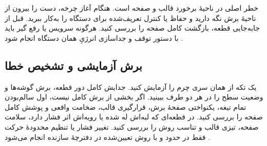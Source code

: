 خطر اصلی در ناحیۀ برخورد قالب و صفحه است. هنگام آغاز چرخه، دست را بیرون از ناحیۀ برش نگه دارید و حفاظ یا کنترل تعریف‌شده برای دستگاه را به‌کار ببرید. قبل از جابه‌جایی قطعه، بازگشت کامل صفحه را بررسی کنید. هرگونه سرویس یا رفع گیر باید با دستور توقف و جداسازی انرژیِ همان دستگاه انجام شود \cite{tippmann,guard}.

\subsection{برش آزمایشی و تشخیص خطا}

یک تکه از همان سری چرم را آزمایش کنید. جدایش کامل دور قطعه، برش گوشه‌ها و وضعیت سطح را در هر دو طرف ببینید. اگر بخشی از برش کامل نیست، اول سالم‌بودن تمام تیغه، یکنواختی صفحۀ برش، قرارگیری قالب، ضخامت واقعی و پوشش کامل صفحه را بررسی کنید. در قطعه‌ای که لبه‌اش له شده یا رویه‌اش اثر فشار دارد، سلامت صفحه، تیزی قالب و تناسب روش را بررسی کنید. تغییر فشار یا تنظیم محدودۀ حرکت فقط در حدود و با روش تعیین‌شده در دفترچۀ سازنده انجام می‌شود \cite{tippmann}.
